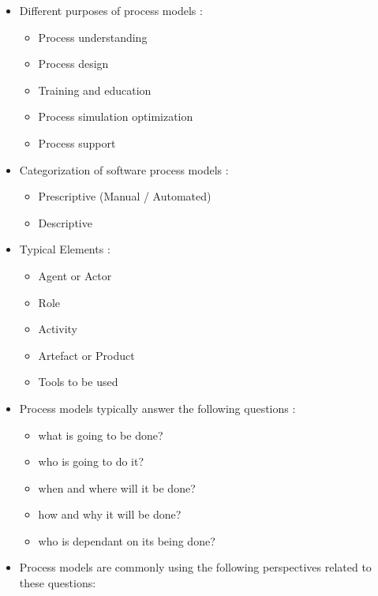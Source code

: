 \begin{itemize}
\begin{itemize}
		\item Process Modells are described using \acp{PML}. A \ac{PML} is defined in terms of a notation, a syntax and semantics, often suitable for computational processing \citep{Bendraou:2005dv}.
	\end{itemize}
	\item Different purposes of process models \citep{Fuggetta:2000ds}:
	\begin{itemize}
		\item Process understanding
		\item Process design
		\item Training and education
		\item Process simulation  optimization
		\item Process support
	\end{itemize}
	\item Categorization of software process models \citep{McChesney:1995aa}:
	\begin{itemize}
		\item Prescriptive (Manual / Automated)
		\item Descriptive
	\end{itemize}
	\item Typical Elements \citep{Benali:1992gq} \citep{Acuna:2001aa} \citep{Fuggetta:2000ds} \citep{Curtis:1992kf}:
	\begin{itemize}
		\item Agent or Actor
		\item Role
		\item Activity
		\item Artefact or Product
		\item Tools to be used
	\end{itemize}
	\item Process models typically answer the following questions \citep{Curtis:1992kf}:
	\begin{itemize}
		\item what is going to be done?
		\item who is going to do it?
		\item when and where will it be done?
		\item how and why it will be done?
		\item who is dependant on its being done?
	\end{itemize}
	\item Process models are commonly using the following perspectives related to these questions:
	\begin{itemize}

\end{itemize}
\end{itemize}

